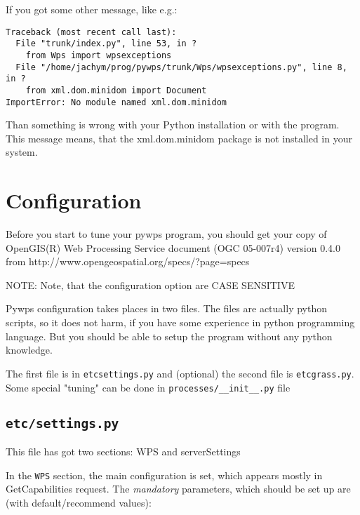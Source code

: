 \documentclass[a4paper,11pt]{article}
\begin{document}
     
    If you got some other message, like e.g.:
     

    \begin{verbatim}
Traceback (most recent call last):
  File "trunk/index.py", line 53, in ?
    from Wps import wpsexceptions
  File "/home/jachym/prog/pywps/trunk/Wps/wpsexceptions.py", line 8, in ?
    from xml.dom.minidom import Document
ImportError: No module named xml.dom.minidom
    \end{verbatim}

     
    Than something is wrong with your Python installation or with the program.
    This message means, that the xml.dom.minidom package is not installed in
    your system.
     


    
    \section{Configuration}
     
    Before you start to tune your pywps program, you should get your copy of
    OpenGIS(R) Web Processing Service document (OGC 05-007r4) version 0.4.0
    from http://www.opengeospatial.org/specs/?page=specs
     

     
    NOTE: Note, that the configuration option are CASE SENSITIVE
     

     
    Pywps configuration takes places in two files. The files are actually python
    scripts, so it does not harm, if you have some experience in python
    programming language. But you should be able to setup the program without
    any python knowledge.
     

     
    The first file is in \texttt{etc\/settings.py} and (optional) the second file is
    \texttt{etc\/grass.py}. Some special "tuning" can be done in \texttt{processes/\_\_init\_\_.py}
    file
     


    \subsection{\texttt{etc/settings.py}}
     
    This file has got two sections: WPS and serverSettings
     

     
    In the \texttt{WPS} section, the main configuration is set, which appears mostly in
    GetCapabilities request. The \emph{mandatory} parameters, which should be set up
    are (with default/recommend values):
     
\end{document}
